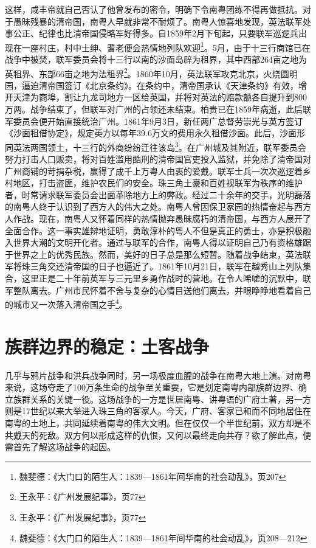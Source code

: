 这样，咸丰帝就自己否认了他曾发布的密令，明确下令南粤团练不得再做抵抗。对于愚昧残暴的清帝国，南粤人早就非常不耐烦了。南粤人惊喜地发现，英法联军处事公正、纪律也比清帝国侵略军好得多。自1859年2月下旬起，只要联军巡逻兵出现在一座村庄，村中士绅、耆老便会热情地列队欢迎\footnote{魏斐德：《大门口的陌生人：1839—1861年间华南的社会动乱》，页207}。5月，由于十三行商馆已在战争中被焚，联军委员会将十三行以南的沙面岛辟为租界，其中西部264亩之地为英租界、东部66亩之地为法租界\footnote{王永平：《广州发展纪事》，页77}。1860年10月，英法联军攻克北京，火烧圆明园，逼迫清帝国签订《北京条约》。在条约中，清帝国承认《天津条约》有效，增开天津为商埠，割让九龙司地方一区给英国，并将对英法的赔款额各自提升到800万两。战争结束了，但联军对广州的占领还未结束。柏贵已在1859年病逝，此后联军委员会便开始直接统治广州。1861年9月3日，新任两广总督劳崇光与英方签订《沙面租借协定》，规定英方以每年39.6万文的费用永久租借沙面。此后，沙面形同英法两国领土，十三行的外商纷纷迁往该岛\footnote{王永平：《广州发展纪事》，页77}。在广州城及其附近，联军委员会努力打击人口贩卖，将对百姓滥用酷刑的清帝国官吏投入监狱，并免除了清帝国对广州商铺的苛捐杂税，赢得了成千上万粤人由衷的爱戴。联军士兵一次次巡逻着乡村地区，打击盗匪，维护农民们的安全。珠三角土豪和百姓视联军为秩序的维护者，时常请求联军委员会出面革除地方上的弊政。经过二十余年的交手，光明磊落的南粤人终于认识到了西方人的伟大之处。南粤人曾因保卫家园的热情奋起与西方人作战。现在，南粤人又怀着同样的热情抛弃愚昧腐朽的清帝国，与西方人展开了全面合作。这一事实雄辩地证明，勇敢淳朴的粤人不但是真正的勇士，亦是积极融入世界大潮的文明开化者。通过与联军的合作，南粤人得以证明自己乃有资格雄踞于世界之上的优秀民族。然而，美好的日子总是那么短暂。随着战争结束，英法联军将珠三角交还清帝国的日子也逼近了。1861年10月21日，联军在越秀山上列队集合，这里正是二十年前英军与三元里乡勇作战时的营地。在令人唏嘘的沉默中，联军整队离去。广州市民怀着不舍与复杂的心情目送他们离去，并眼睁睁地看着自己的城市又一次落入清帝国之手\footnote{魏斐德：《大门口的陌生人：1839—1861年间华南的社会动乱》，页208—212}。

\section{族群边界的稳定：土客战争}

\indent 几乎与鸦片战争和洪兵战争同时，另一场极度血腥的战争在南粤大地上演。对南粤来说，这场夺走了100万条生命的战争至关重要，它是划定南粤内部族群边界、确立族群关系的关键一役。这场战争的一方是世居南粤、讲粤语的广府土著，另一方则是17世纪以来大举进入珠三角的客家人。今天，广府、客家已和而不同地居住在南粤的土地上，共同延续着南粤的伟大文明。但在仅仅一个半世纪前，双方却是不共戴天的死敌。双方何以形成这样的仇恨，又何以最终走向共存？欲了解此点，便需首先了解这场战争的起因。


